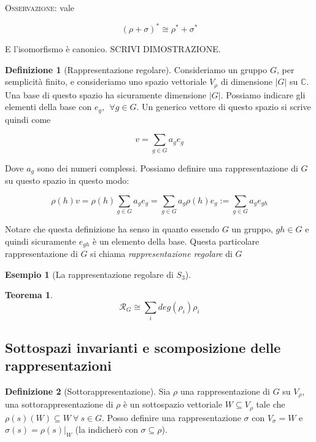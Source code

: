 \documentclass[11pt]{article}
\theoremstyle{plain}
\newtheorem{thm}{Teorema}[section]
\theoremstyle{definition}
\newtheorem{defn}{Definizione}[section]
\newtheorem{exmp}{Esempio}[section]
\theoremstyle{remark}
\newcommand{\C}{\mathbb{C}}
\newcommand{\dsum}{\displaystyle\sum}
\begin{document}
\textsc{Osservazione:} vale

\[ (\rho + \sigma)^* \cong \rho^* + \sigma^* \]

E l'isomorfismo è canonico. SCRIVI DIMOSTRAZIONE.





\begin{defn}[Rappresentazione regolare]
  Consideriamo un gruppo $G$, per semplicità finito, e consideriamo uno spazio vettoriale $V_\rho$ di dimensione $|G|$ su $\C$. Una base di questo spazio ha sicuramente dimensione $|G|$. Possiamo indicare gli elementi della base con $e_g, \ \ \forall g \in G$. Un generico vettore di questo spazio si scrive quindi come

  \[ v = \dsum_{g \in G} a_g e_g \]

  Dove $a_g$ sono dei numeri complessi. Possiamo definire una rappresentazione di $G$ su questo spazio in questo modo:

  \[ \rho(h)v = \rho(h) \dsum_{g \in G} a_g e_g = \dsum_{g\in G} a_g \rho(h) e_g := \dsum_{g \in G} a_g e_{gh} \]

  Notare che questa definizione ha senso in quanto essendo $G$ un gruppo, $gh \in G$ e quindi sicuramente $e_{gh}$ è un elemento della base. Questa particolare rappresentazione di $G$ si chiama \emph{rappresentazione regolare} di $G$


  
  \label{defn:rappresentazione regolare}
\end{defn}

\begin{exmp}[La rappresentazione regolare di $S_3$]


\end{exmp}


\begin{thm}

\[\mathcal{R}_G \cong \dsum_i deg(\rho_i) \rho_i \]

\end{thm}



\subsection{Sottospazi invarianti e scomposizione delle rappresentazioni}



\begin{defn}[Sottorappresentazione]
Sia $\rho$ una rappresentazione di $G$ su $V_{\rho}$, una sottorappresentazione di $\rho$ è un sottospazio vettoriale $W\subseteq V_{\rho}$ tale che $\rho(s)(W)\subseteq W\ \forall\ s\in G$. Posso definire una rappresentazione $\sigma$ con $V_{\sigma}=W$ e $\sigma(s)=\rho(s)|_W$ (la indicherò con $\sigma\subseteq \rho$).
\end{defn}
\end{document}
